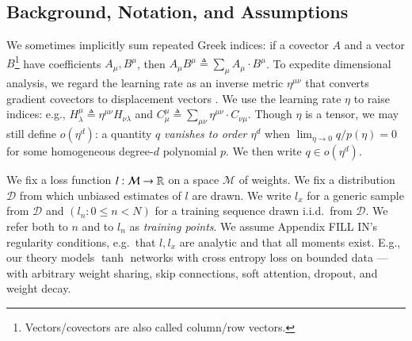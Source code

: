 \documentclass{article}
\theoremstyle{plain}
\theoremstyle{definition}
\newcommand{\Dd}{\mathcal{D}}
\newcommand{\Mm}{\mathcal{M}}
\begin{document}
\subsection{Background, Notation, and Assumptions} \label{sect:background}
       

        We sometimes implicitly sum repeated Greek indices: if a covector $A$
        and a vector $B$\footnote{
            Vectors/covectors are also called column/row vectors.
        } have coefficients $A_\mu, B^\mu$, then 
        $
            A_\mu B^\mu
            \triangleq
            \sum_\mu A_\mu \cdot B^\mu
        $.
        To expedite dimensional analysis, we regard the learning rate as an
        inverse metric $\eta^{\mu\nu}$ that converts gradient covectors to
        displacement vectors \citep{bo13}.  We use the learning rate
        $\eta$ to raise indices: e.g.,
        $
            H^{\mu}_{\lambda}
            \triangleq
            \eta^{\mu\nu} H_{\nu\lambda}
        $ and
        $
            C^{\mu}_{\mu}
            \triangleq
            \sum_{\mu \nu} \eta^{\mu\nu} \cdot C_{\nu\mu}
        $.
        Though $\eta$ is a tensor, we may still define $o(\eta^d)$: a quantity
        $q$ \emph{vanishes to order $\eta^d$} when $\lim_{\eta\to 0} q/p(\eta)
        = 0$ for some homogeneous degree-$d$ polynomial $p$.  We then write $q
        \in o(\eta^d)$.




        We fix a loss function $l:\Mm\to\RR$ on a space $\Mm$ of weights.  We
        fix a distribution $\Dd$ from which unbiased estimates of $l$ are
        drawn.  We write $l_x$ for a generic sample from $\Dd$ and $(l_n: 0\leq
        n<N)$ for a training sequence drawn i.i.d.\ from $\Dd$.  We refer both
        to $n$ and to $l_n$ as \emph{training points}.  We assume Appendix
        {\color{red} FILL IN}'s regularity conditions, e.g.\ that $l, l_x$ are
        analytic and that all moments exist.
        E.g., our theory models $\tanh$ networks with cross entropy loss on
        bounded data --- with arbitrary weight sharing, skip connections, soft
        attention, dropout, and weight decay.
        
\end{document}

